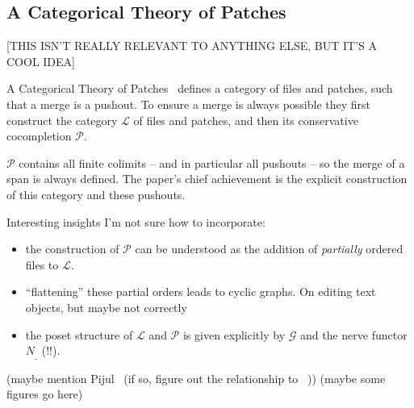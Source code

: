 \subsection{A Categorical Theory of Patches}

[THIS ISN'T REALLY RELEVANT TO ANYTHING ELSE, BUT IT'S A COOL IDEA]

A Categorical Theory of Patches~\cite{Categorical2013} defines a category of
files and patches, such that a merge is a pushout. To ensure a merge is always
possible they first construct the category $\mathcal{L}$ of files and patches,
and then its conservative cocompletion $\mathcal{P}$.

$\mathcal{P}$ contains all finite colimits -- and in particular all pushouts --
so the merge of a span is always defined. The paper's chief achievement is the
explicit construction of this category and these pushouts.

Interesting insights I'm not sure how to incorporate:
\begin{itemize}
\item the construction of $\mathcal{P}$ can be understood as the addition of \emph{partially} ordered
  files to $\mathcal{L}$.
\item ``flattening'' these partial orders leads to cyclic graphs. On editing
  text~\cite{editing2014} objects, but maybe not correctly
\item the poset structure of $\mathcal{L}$ and $\mathcal{P}$ is given explicitly
  by $\mathcal{G}$ and the nerve functor $N_{\_}$ (!!).
\end{itemize}

(maybe mention Pijul~\cite{Pijul} (if so, figure out the relationship to ~\cite{Categorical2013}))
(maybe some figures go here)